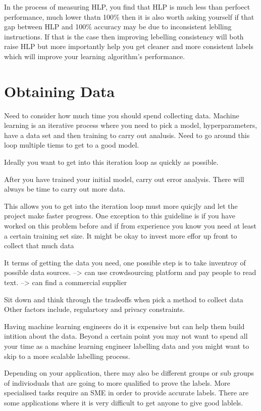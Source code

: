 In the process of measuring HLP, you find that HLP is much less than perfoect performance, much lower thatn 100\% then it is also worth asking yourself if that gap between HLP and 100\% accuracy may be due to inconsistent leblling instructions.
If that is the case then improving lebelling consistency will both raise HLP but more importantly help you get cleaner and more consistent labels which will improve your learning algorithm's performance.

\section{Obtaining Data}

Need to consider how much time you should spend collecting data.
Machine learning is an iterative process where you need to pick a model, hyperparameters, have a data set and then training to carry out analusis.
Need to go around this loop multiple tiems to get to a good model.

Ideally you want to get into this iteration loop as quickly as possible.

After you have trained your initial model, carry out error analysis.
There will always be time to carry out more data.

This allows you to get into the iteration loop must more quicjly and let the project make faster progress.
One exception to this guideline is if you have worked on this problem before and if from experience you know you need at least a certain training set size.
It might be okay to invest more effor up front to collect that much data

It terms of getting the data you need, one possible step is to take inventroy of possible data sources.
--> can use crowdsourcing  platform and pay people to read text.
--> can find a commercial supplier

Sit down and think through the tradeoffs when pick a method to collect data
Other factors include, regulartory and privacy constraints.

Having machine learning engineers do it is expensive but can help them build intition about the data.
Beyond a certain point you may not want to spend all your time as a machine learning engineer labelling data and you might want to skip to a more scalable labelling process.

Depending on your application, there may also be different groups or sub groups of indivioduals that are going to more qualified to prove the labels.
More specialised tasks require an SME in order to provide accurate labels.
There are some applications where it is very difficult to get anyone to give good lablels.

